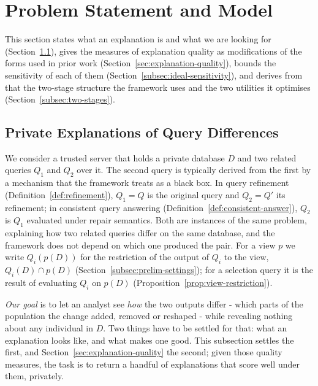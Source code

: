 
\section{Problem Statement and Model}\label{sec:model}

This section states what an explanation is and what we are looking for (Section~\ref{subsec:private-query-difference-setting}), gives the measures of explanation quality as modifications of the forms used in prior work (Section~\ref{sec:explanation-quality}), bounds the sensitivity of each of them (Section~\ref{subsec:ideal-sensitivity}), and derives from that the two-stage structure the framework uses and the two utilities it optimises (Section~\ref{subsec:two-stages}).

\subsection{Private Explanations of Query Differences}
\label{subsec:private-query-difference-setting}

We consider a trusted server that holds a private database $D$ and two related queries $Q_1$ and $Q_2$ over it.
The second query is typically derived from the first by a mechanism that the framework treats as a black box.
In query refinement (Definition~\ref{def:refinement}), $Q_1=Q$ is the original query and $Q_2=Q'$ its refinement; in consistent query answering (Definition~\ref{def:consistent-answer}), $Q_2$ is $Q_1$ evaluated under repair semantics.
Both are instances of the same problem, explaining how two related queries differ on the same database, and the framework does not depend on which one produced the pair.
For a view $p$ we write $Q_i(p(D))$ for the restriction of the output of $Q_i$ to the view, $Q_i(D)\cap p(D)$ (Section~\ref{subsec:prelim-settings}); for a selection query it is the result of evaluating $Q_i$ on $p(D)$ (Proposition~\ref{prop:view-restriction}).

\emph{Our goal} is to let an analyst see \emph{how} the two outputs differ - which parts of the population the change added, removed or reshaped - while revealing nothing about any individual in $D$.
Two things have to be settled for that: what an explanation looks like, and what makes one good.
This subsection settles the first, and Section~\ref{sec:explanation-quality} the second; given those quality measures, the task is to return a handful of explanations that score well under them, privately.

